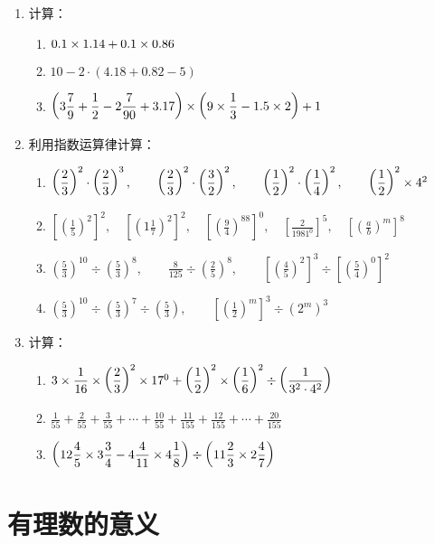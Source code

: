 \begin{enumerate}
	\item 计算：
	\begin{enumerate}
		\item $0.1\times 1.14+0.1\times 0.86$
		\item $10-2\cdot (4.18+0.82-5)$
		\item $\left(3\dfrac{7}{9}+\dfrac{1}{2}-2\dfrac{7}{90}+3.17\right)\times\left(9\times\dfrac{1}{3}-1.5\times 2\right)+1$
	\end{enumerate}
	
	\item 利用指数运算律计算：
	\begin{enumerate}
		\item $\left(\dfrac{2}{3}\right)^2\cdot \left(\dfrac{2}{3}\right)^3,\qquad \left(\dfrac{2}{3}\right)^2\cdot \left(\dfrac{3}{2}\right)^2,\qquad \left(\dfrac{1}{2}\right)^2\cdot \left(\dfrac{1}{4}\right)^2,\qquad \left(\dfrac{1}{2}\right)^2\times 4^2$
		\item $\left[\left(\frac{1}{5}\right)^2\right]^2,\quad \left[\left(1\frac{1}{7}\right)^2\right]^2,\quad \left[\left(\frac{9}{4}\right)^{88}\right]^0,\quad \left[\frac{2}{1981^0}\right]^5,\quad \left[\left(\frac{a}{b}\right)^m\right]^8$
		\item $\left(\frac{5}{3}\right)^{10}\div \left(\frac{5}{3}\right)^8,\qquad \frac{8}{125}\div\left(\frac{2}{5}\right)^8,\qquad \left[\left(\frac{4}{5}\right)^2\right]^3\div \left[\left(\frac{5}{4}\right)^0\right]^2$
		\item $\left(\frac{5}{3}\right)^{10}\div \left(\frac{5}{3}\right)^7\div \left(\frac{5}{3}\right),\qquad \left[\left(\frac{1}{2}\right)^m\right]^3\div (2^m)^3$
	\end{enumerate}
	
	\item 计算：
	\begin{enumerate}
		\item $3\times\dfrac{1}{16}\times\left(\dfrac{2}{3}\right)^2\times 17^0+\left(\dfrac{1}{2}\right)^2\times\left(\dfrac{1}{6}\right)^2\div \left(\dfrac{1}{3^2\cdot 4^2}\right)$
		\item  $\frac{1}{55}+\frac{2}{55}+\frac{3}{55}+\cdots+\frac{10}{55}+\frac{11}{155}+\frac{12}{155}+\cdots +\frac{20}{155}$ 
		\item $\left(12\dfrac{4}{5}\times 3\dfrac{3}{4}-4\dfrac{4}{11}\times 4\dfrac{1}{8}\right)\div \left(11\dfrac{2}{3}\times 2\dfrac{4}{7}\right)$
	\end{enumerate}
	
\end{enumerate}

\section{有理数的意义}
